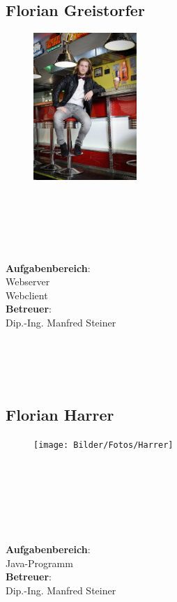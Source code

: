 \subsection*{Florian Greistorfer}
\begin{figure}
\begin{center}
  \includegraphics[width=0.35\textwidth]{Bilder/Fotos/Greistorfer}
\end{center}
\end{figure}
\mbox{}\\
\mbox{}\\
\mbox{}\\
\mbox{}\\
\mbox{}\\
\textbf{Aufgabenbereich}:\\
Webserver\\
Webclient\\
\textbf{Betreuer}:\\
Dip.-Ing. Manfred Steiner
\mbox{}\\
\mbox{}\\
\mbox{}\\
\mbox{}\\
\mbox{}\\

\subsection*{Florian Harrer}
\begin{figure}
\begin{center}
  \texttt{[image: Bilder/Fotos/Harrer]}
\end{center}
\end{figure}
\mbox{}\\
\mbox{}\\
\mbox{}\\
\mbox{}\\
\mbox{}\\
\mbox{}\\
\textbf{Aufgabenbereich}:\\
Java-Programm\\
\textbf{Betreuer}:\\
Dip.-Ing. Manfred Steiner
\mbox{}\\
\mbox{}\\
\mbox{}\\
\mbox{}\\
\mbox{}\\
\newpage

